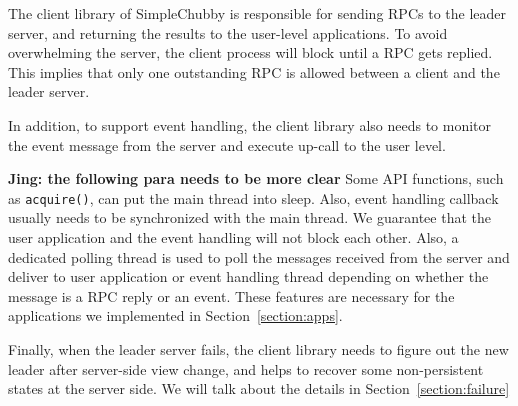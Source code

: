 The client library of SimpleChubby is responsible for sending RPCs to the
leader server, and returning the results to the user-level applications.
To avoid overwhelming the server, the client process will block until a RPC
gets replied. This implies that only one
outstanding RPC is allowed between a client and the leader server.

In addition, to support event handling, the client library also needs to
monitor the event message from the server and execute up-call
to the user level.

\textbf{Jing: the following para needs to be more clear}
Some API functions, such as \texttt{acquire()}, can put
the main thread into sleep. Also, event handling callback usually needs to
be synchronized with the main thread. We guarantee that the user application
and the event handling will not block each other.
Also, a dedicated polling
thread is used to poll the messages received from the server and deliver to
user application or event handling thread depending on whether the message
is a RPC reply or an event. These features are necessary
for the applications we implemented in Section~\ref{section:apps}.

Finally, when the leader server fails, the client library needs to figure out
the new leader after server-side view change, and helps to recover some
non-persistent states at the server side. We will talk about the details in
Section~\ref{section:failure}




